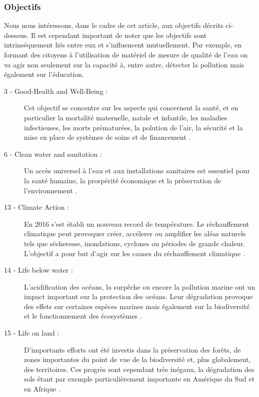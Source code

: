 \documentclass[10pt, conference, compsocconf]{llncs}
\begin{document}
		\subsubsection{Objectifs}
		Nous nous intéressons, dans le cadre de cet article, aux objectifs décrits ci-dessous. Il est cependant important de noter que les objectifs sont intrinséquement liés entre eux et s'influencent mutuellement. Par exemple, en formant des citoyens à l'utilisation de matériel de mesure de qualité de l'eau on va agir non seulement sur la capacité à, entre autre, détecter la pollution mais également sur l'éducation.
		\begin{description}
			\item[ 3 - Good-Health and Well-Being :] Cet objectif se concentre sur les aspects qui	concernent la santé, et en particulier la mortalité maternelle, natale et infantile, les maladies infectieuses, les morts prématurées, la polution de l'air, la sécurité et la mise en place de systèmes de soins et de financement \cite{united_nations_goal_nodate-5}.
			\item[ 6 - Clean water and sanitation :] Un accès universel à l'eau et aux installations sanitaires est essentiel pour la santé humaine, la prospérité économique et la préservation de l'environnement \cite{united_nations_goal_nodate-4}.
			\item[13 - Climate Action :] En 2016 s'est établi un nouveau record de température. Le réchauffement climatique peut provoquer créer, accélerer ou amplifier les aléas	naturels tels que sécheresse, inondations, cyclones ou périodes de grande chaleur. L'objectif a pour but d'agir sur les causes du réchauffement climatique \cite{united_nations_goal_nodate}.
			\item[14 - Life below water :] L'acidification des océans, la surpêche ou encore la pollution marine ont un impact important sur la protection des océans. Leur dégradation provoque des effets sur certaines espèces marines mais également sur la biodiversité et le fonctionnement des écosystèmes \cite{united_nations_goal_nodate-2}.
			\item[15 - Life on land :] D'importants efforts ont été investis dans la préservation des forêts, de zones importantes du point de vue de la biodiversité et, plus globalement, des territoires. Ces progrès sont cependant très inégaux, la dégradation des sols étant par exemple particulièrement importante en Amérique du Sud et en Afrique \cite{united_nations_goal_nodate-3}.
		\end{description}
		
\end{document}
